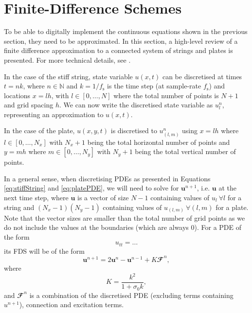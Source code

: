 \documentclass{article}
\begin{document}
\section{Finite-Difference Schemes}\label{sec:FDS}
To be able to digitally implement the continuous equations shown in the previous section, they need to be approximated. In this section, a high-level review of a finite difference approximation to a connected system of strings and plates is presented. For more technical details, see \cite{Bilbao2009:ModularPercussion}. 

In the case of the stiff string, state variable $u(x,t)$ can be discretised at times $t = nk$, where $n \in \mathbb{N}$ and $k = 1 / f_\text{s}$ is the time step (at sample-rate $f_\text{s}$) and locations $x = lh$, with $l \in [0,\hdots, N]$ where the total number of points is $N+1$ and grid spacing $h$. We can now write the discretised state variable as $u_l^n$, representing an approximation to $u(x,t)$. 

In the case of the plate, $u(x,y,t)$ is discretised to $u_{(l,m)}^n$ using $x = lh$ where $l \in [0,\hdots, N_x]$ with $N_x+1$ being the total horizontal number of points and $y = mh$ where $m \in [0,\hdots,N_y]$ with $N_y+1$ being the total vertical number of points. 

In a general sense, when discretising PDEs as presented in Equations \eqref{eq:stiffString} and \eqref{eq:platePDE}, we will need to solve for $\mathbf{u}^{n+1}$, i.e. $\mathbf{u}$ at the next time step, where $\mathbf{u}$ is a vector of size $N-1$ containing values of $u_l \ \forall l$ for a string and $(N_x-1)(N_y-1)$ containing values of $u_{(l,m)}\ \forall (l,m)$ for a plate. Note that the vector sizes are smaller than the total number of grid points as we do not include the values at the boundaries (which are always 0).
For a PDE of the form 
\begin{equation}
u_{tt} = \hdots \label{eq:PDEform}
\end{equation}
its FDS will be of the form
\begin{equation}\label{eq:FDSform}
    \mathbf{u}^{n+1} = 2\mathbf{u}^n-\mathbf{u}^{n-1} + K\mathbfcal{F}^n,
\end{equation}
where
\begin{equation}\label{eq:K}
    K = \frac{k^2}{1+\sigma_0k},
\end{equation}
and $\mathbfcal{F}^n$ is a combination of the discretised PDE (excluding terms containing $u^{n+1}$), connection and excitation terms.
\end{document}
